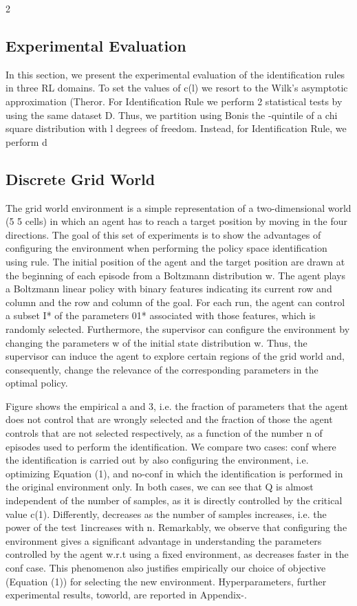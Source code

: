\documentclass{article}
\begin{document}
\begin{paracol}{2}
\subsection*{Experimental Evaluation}


In this section, we present the experimental evaluation of the
identification rules in three RL domains. To set the values of
c(l) we resort to the Wilk's asymptotic approximation (Theror. For Identification Rule we perform 2 statistical tests by
using the same dataset D. Thus, we partition  using Bonis the -quintile of a chi square distribution with l degrees
of freedom. Instead, for Identification Rule, we perform d


\subsection*{Discrete Grid World}


The grid world environment is a simple representation of a
two-dimensional world (5  5 cells) in which an agent has to
reach a target position by moving in the four directions. The
goal of this set of experiments is to show the advantages
of configuring the environment when performing the policy space identification using rule. The initial position of the
agent and the target position are drawn at the beginning of
each episode from a Boltzmann distribution w. The agent
plays a Boltzmann linear policy  with binary features  indicating its current row and column and the row and column
of the goal. For each run, the agent can control a subset I*
of the parameters 01* associated with those features, which
is randomly selected. Furthermore, the supervisor can configure the environment by changing the parameters w of the
initial state distribution w. Thus, the supervisor can induce
the agent to explore certain regions of the grid world and,
consequently, change the relevance of the corresponding parameters in the optimal policy.

\switchcolumn
\RaggedRight

Figure shows the empirical a and 3, i.e. the fraction of
parameters that the agent does not control that are wrongly
selected and the fraction of those the agent controls that are
not selected respectively, as a function of the number n of
episodes used to perform the identification. We compare two
cases: conf where the identification is carried out by also
configuring the environment, i.e. optimizing Equation (1),
and no-conf in which the identification is performed in the
original environment only. In both cases, we can see that
Q is almost independent of the number of samples, as it is
directly controlled by the critical value c(1). Differently, 
decreases as the number of samples increases, i.e. the power
of the test 1increases with n. Remarkably, we observe
that configuring the environment gives a significant advantage in understanding the parameters controlled by the agent
w.r.t using a fixed environment, as  decreases faster in the
conf case. This phenomenon also justifies empirically our
choice of objective (Equation (1)) for selecting the new environment. Hyperparameters, further experimental results, toworld, are reported in Appendix-.



\end{paracol}
\end{document}
